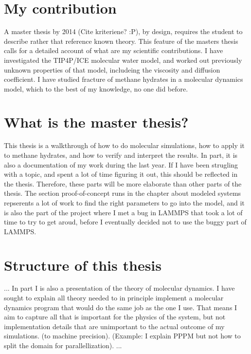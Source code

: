\section{My contribution}
A master thesis by 2014 (Cite kriteriene? :P), by design, requires the student to describe rather that reference known theory. This feature of the masters thesis calls for a detailed account of what are my scientific contributions. I have investigated the TIP4P/ICE molecular water model, and worked out previously unknown properties of that model, includeing the viscosity and diffusion coefficient. I have studied fracture of methane hydrates in a molecular dynamics model, which to the best of my knowledge, no one did before.

\section{What is the master thesis?}
This thesis is a walkthrough of how to do molecular simulations, how to apply it to methane hydrates, and how to verify and interpret the results. In part, it is also a documentation of my work during the last year. If I have been strugling with a topic, and spent a lot of time figuring it out, this should be reflected in the thesis. Therefore, these parts will be more elaborate than other parts of the thesis. The section proof-of-concept runs in the chapter about modeled systems repserents a lot of work to find the right parameters to go into the model, and it is also the part of the project where I met a bug in LAMMPS that took a lot of time to try to get aroud, before I eventually decided not to use the buggy part of LAMMPS.


\section{Structure of this thesis}
...
In part I is also a presentation of the theory of molecular dynamics. I have sought to explain all theory needed to in principle implement a molecular dynamics program that would do the same job as the one I use. That means I aim to capture all that is important for the physics of the system, but not implementation details that are unimportant to the actual outcome of my simulations. (to machine precision). (Example: I explain PPPM but not how to split the domain for parallellization).
...
